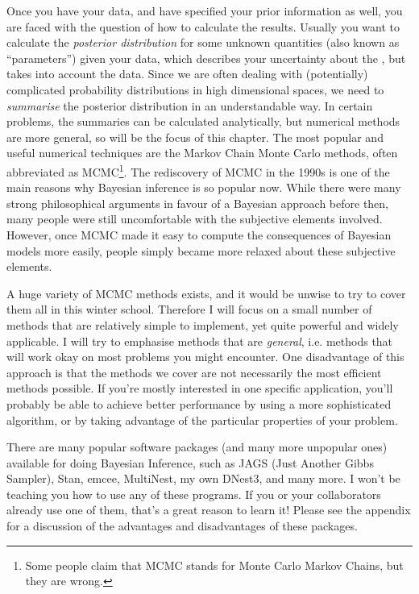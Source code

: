 Once you have your data, and have specified your prior information as well,
you are faced with the question of how to calculate the
results. Usually you want to calculate the {\it posterior distribution} for some
unknown quantities (also known as ``parameters'') given your data, which
describes your uncertainty about the , but takes into account the data.
Since we are often dealing with (potentially) complicated probability
distributions in high dimensional spaces, we need to {\it summarise} the
posterior distribution in an understandable way.
In certain problems, the summaries can be calculated analytically, but
numerical methods are more general, so will be the focus of this chapter.
The most popular and useful numerical techniques are the Markov Chain Monte
Carlo methods, often abbreviated as
MCMC\footnote{Some people claim that MCMC stands for
Monte Carlo Markov Chains, but they are wrong.}.
The rediscovery of MCMC in the 1990s
is one of the main reasons why Bayesian inference is so popular now.
While there were many strong philosophical arguments in favour of a Bayesian
approach before then, many people were still uncomfortable with the
subjective elements involved. However, once MCMC made it easy to compute the
consequences of Bayesian models more easily, people simply became more relaxed
about these subjective elements.

A huge variety of MCMC methods exists, and it would be
unwise to try to cover them all in this winter school. Therefore I will focus
on a small number of methods that are relatively simple to implement, yet quite powerful
and widely applicable. I will try to emphasise methods that are {\it general},
i.e. methods that will work okay on most problems you might encounter. One
disadvantage of this approach is that the methods we cover are not necessarily
the most efficient methods possible. If you're mostly interested in one
specific application, you'll probably be able to achieve better performance
by using a more sophisticated algorithm, or by taking advantage of the particular
properties of your problem.

There are many popular software packages (and many more unpopular ones)
available for doing Bayesian Inference, such as JAGS (Just Another Gibbs Sampler),
Stan, emcee, MultiNest, my own DNest3, and many more.
I won't be teaching you how to use any of these programs.
If you or your collaborators already use one of them, that's a great reason to
learn it! Please see the appendix for a discussion of the advantages and
disadvantages of these packages.

